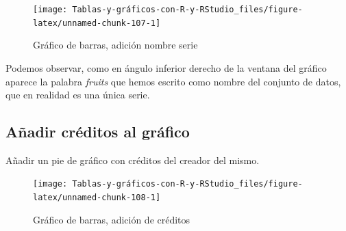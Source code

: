 \documentclass[
]{book}
\newenvironment{Shaded}{\begin{snugshade}}{\end{snugshade}}
\newcommand{\AttributeTok}[1]{\textcolor[rgb]{0.77,0.63,0.00}{#1}}
\newcommand{\ConstantTok}[1]{\textcolor[rgb]{0.00,0.00,0.00}{#1}}
\newcommand{\FunctionTok}[1]{\textcolor[rgb]{0.00,0.00,0.00}{#1}}
\newcommand{\NormalTok}[1]{#1}
\newcommand{\SpecialCharTok}[1]{\textcolor[rgb]{0.00,0.00,0.00}{#1}}
\newcommand{\StringTok}[1]{\textcolor[rgb]{0.31,0.60,0.02}{#1}}
\begin{document}
\begin{figure}[H]

{\centering \texttt{[image: Tablas-y-gráficos-con-R-y-RStudio\_files/figure-latex/unnamed-chunk-107-1]} 

}

\caption{Gráfico de barras, adición nombre serie}\label{fig:unnamed-chunk-107}
\end{figure}

Podemos observar, como en ángulo inferior derecho de la ventana del gráfico aparece la palabra \emph{fruits} que hemos escrito como nombre del conjunto de datos, que en realidad es una única serie.

\hypertarget{auxf1adir-cruxe9ditos-al-gruxe1fico}{%
\subsection{Añadir créditos al gráfico}\label{auxf1adir-cruxe9ditos-al-gruxe1fico}}

Añadir un pie de gráfico con créditos del creador del mismo.

\begin{Shaded}
\end{Shaded}

\begin{figure}[H]

{\centering \texttt{[image: Tablas-y-gráficos-con-R-y-RStudio\_files/figure-latex/unnamed-chunk-108-1]} 

}

\caption{Gráfico de barras, adición de créditos}\label{fig:unnamed-chunk-108}
\end{figure}
\end{document}
